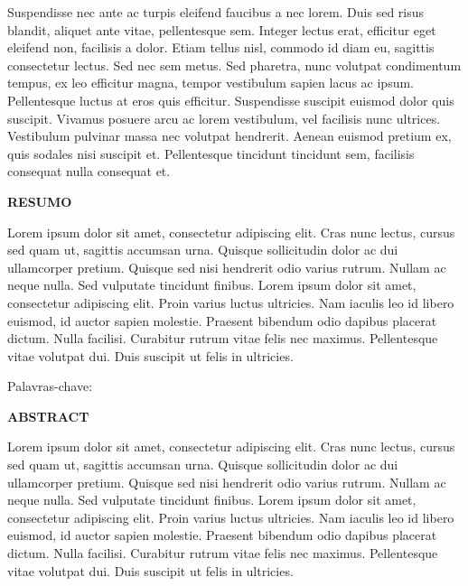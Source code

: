 Suspendisse nec ante ac turpis eleifend faucibus a nec lorem. Duis sed risus blandit, aliquet ante vitae, pellentesque sem. Integer lectus erat, efficitur eget eleifend non, facilisis a dolor. Etiam tellus nisl, commodo id diam eu, sagittis consectetur lectus. Sed nec sem metus. Sed pharetra, nunc volutpat condimentum tempus, ex leo efficitur magna, tempor vestibulum sapien lacus ac ipsum. Pellentesque luctus at eros quis efficitur. Suspendisse suscipit euismod dolor quis suscipit. Vivamus posuere arcu ac lorem vestibulum, vel facilisis nunc ultrices. Vestibulum pulvinar massa nec volutpat hendrerit. Aenean euismod pretium ex, quis sodales nisi suscipit et. Pellentesque tincidunt tincidunt sem, facilisis consequat nulla consequat et.

\newpage

\thispagestyle{empty}
\setlength{\parindent}{0pt}


\textbf{RESUMO}

Lorem ipsum dolor sit amet, consectetur adipiscing elit. Cras nunc lectus, cursus sed quam ut, sagittis accumsan urna. Quisque sollicitudin dolor ac dui ullamcorper pretium. Quisque sed nisi hendrerit odio varius rutrum. Nullam ac neque nulla. Sed vulputate tincidunt finibus. Lorem ipsum dolor sit amet, consectetur adipiscing elit. Proin varius luctus ultricies. Nam iaculis leo id libero euismod, id auctor sapien molestie. Praesent bibendum odio dapibus placerat dictum. Nulla facilisi. Curabitur rutrum vitae felis nec maximus. Pellentesque vitae volutpat dui. Duis suscipit ut felis in ultricies.

\vspace*{1\baselineskip}

Palavras-chave:

\newpage

\thispagestyle{empty}
\setlength{\parindent}{0pt}


\textbf{ABSTRACT}

Lorem ipsum dolor sit amet, consectetur adipiscing elit. Cras nunc lectus, cursus sed quam ut, sagittis accumsan urna. Quisque sollicitudin dolor ac dui ullamcorper pretium. Quisque sed nisi hendrerit odio varius rutrum. Nullam ac neque nulla. Sed vulputate tincidunt finibus. Lorem ipsum dolor sit amet, consectetur adipiscing elit. Proin varius luctus ultricies. Nam iaculis leo id libero euismod, id auctor sapien molestie. Praesent bibendum odio dapibus placerat dictum. Nulla facilisi. Curabitur rutrum vitae felis nec maximus. Pellentesque vitae volutpat dui. Duis suscipit ut felis in ultricies.

